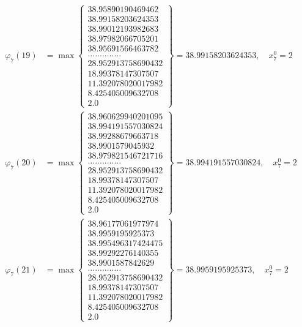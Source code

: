 \documentclass{article}
\begin{document}
\begin{align*}
  
  
  
\varphi_{7}(19) &= \max \left\{ \begin{array}{c}
38.95890190469462 \\
 38.99158203624353 \\
 38.99012193982683 \\
 38.97982066705201 \\
 38.95691566463782 \\
 .............. \\
 28.952913758690432 \\
 18.99378147307507 \\
 11.392078020017982 \\
 8.425405009632708 \\
 2.0
\end{array} \right\} = 38.99158203624353, \quad x_{7}^0 = 2\\
  
  
  
  
\varphi_{7}(20) &= \max \left\{ \begin{array}{c}
38.960629940201095 \\
 38.994191557030824 \\
 38.99288679663718 \\
 38.9901579045932 \\
 38.979821546721716 \\
 .............. \\
 28.952913758690432 \\
 18.99378147307507 \\
 11.392078020017982 \\
 8.425405009632708 \\
 2.0
\end{array} \right\} = 38.994191557030824, \quad x_{7}^0 = 2\\
  
  
  
  
\varphi_{7}(21) &= \max \left\{ \begin{array}{c}
38.96177061977974 \\
 38.9959195925373 \\
 38.995496317424475 \\
 38.99292276140355 \\
 38.9901587842629 \\
 .............. \\
 28.952913758690432 \\
 18.99378147307507 \\
 11.392078020017982 \\
 8.425405009632708 \\
 2.0
\end{array} \right\} = 38.9959195925373, \quad x_{7}^0 = 2\\
  

\end{align*}
\end{document}
